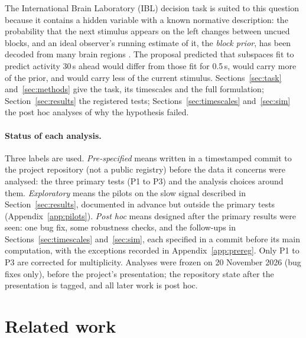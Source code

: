 \documentclass{article}
\begin{document}
The International Brain Laboratory (IBL) decision task \citep{ibl2021task,ibl2025bwm} is suited to this question
because it contains a hidden variable with a known normative description: the probability that the next stimulus
appears on the left changes between uncued blocks, and an ideal observer's running estimate of it, the
\emph{block prior}, has been decoded from many brain regions \citep{findling2025}. The proposal predicted that
subspaces fit to predict activity 30\,s ahead would differ from those fit for 0.5\,s, would carry more of the prior,
and would carry less of the current stimulus. Sections~\ref{sec:task} and~\ref{sec:methods} give the task, its
timescales and the full formulation; Section~\ref{sec:results} the registered tests; Sections~\ref{sec:timescales}
and~\ref{sec:sim} the post hoc analyses of why the hypothesis failed.

\paragraph{Status of each analysis.} Three labels are used. \emph{Pre-specified} means written in a timestamped
commit to the project repository (not a public registry) before the data it concerns were analysed: the three primary
tests (P1 to P3) and the analysis choices around them. \emph{Exploratory} means the pilots on the slow signal
described in Section~\ref{sec:results}, documented in advance but outside the primary tests
(Appendix~\ref{app:pilots}). \emph{Post hoc} means designed after the primary results were seen: one bug fix, some
robustness checks, and the follow-ups in Sections~\ref{sec:timescales} and~\ref{sec:sim}, each specified in a commit
before its main computation, with the exceptions recorded in Appendix~\ref{app:prereg}. Only P1 to P3 are corrected
for multiplicity. Analyses were frozen on 20 November 2026 (bug fixes only), before the project's presentation; the
repository state after the presentation is tagged, and all later work is post hoc.

\section{Related work}
\label{sec:related}
\end{document}
